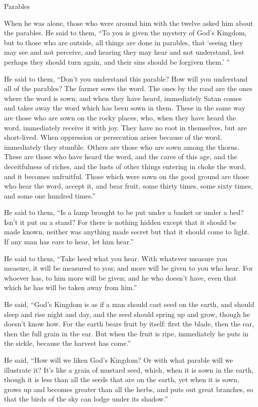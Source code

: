 \documentclass[10pt,twoside]{book}
\begin{document}
\begin{section}{Parables}
{  When he was alone, those who were around him with the twelve asked him about the parables.   He said to them, ``To you is given the mystery of God's Kingdom, but to those who are outside, all things are done in parables,    that `seeing they may see and not perceive, and hearing they may hear and not understand, lest perhaps they should turn again, and their sins should be forgiven them.' ''

  He said to them, ``Don't you understand this parable? How will you understand all of the parables?    The farmer sows the word.    The ones by the road are the ones where the word is sown; and when they have heard, immediately Satan comes and takes away the word which has been sown in them.    These in the same way are those who are sown on the rocky places, who, when they have heard the word, immediately receive it with joy.    They have no root in themselves, but are short-lived. When oppression or persecution arises because of the word, immediately they stumble.    Others are those who are sown among the thorns. These are those who have heard the word,    and the cares of this age, and the deceitfulness of riches, and the lusts of other things entering in choke the word, and it becomes unfruitful.    Those which were sown on the good ground are those who hear the word, accept it, and bear fruit, some thirty times, some sixty times, and some one hundred times.''

  He said to them, ``Is a lamp brought to be put under a basket  or under a bed? Isn't it put on a stand?    For there is nothing hidden except that it should be made known, neither was anything made secret but that it should come to light.    If any man has ears to hear, let him hear.''

  He said to them, ``Take heed what you hear. With whatever measure you measure, it will be measured to you; and more will be given to you who hear.    For whoever has, to him more will be given; and he who doesn't have, even that which he has will be taken away from him.''

  He said, ``God's Kingdom is as if a man should cast seed on the earth,    and should sleep and rise night and day, and the seed should spring up and grow, though he doesn't know how.    For the earth bears fruit by itself: first the blade, then the ear, then the full grain in the ear.    But when the fruit is ripe, immediately he puts in the sickle, because the harvest has come.''

  He said, ``How will we liken God's Kingdom? Or with what parable will we illustrate it?    It's like a grain of mustard seed, which, when it is sown in the earth, though it is less than all the seeds that are on the earth,    yet when it is sown, grows up and becomes greater than all the herbs, and puts out great branches, so that the birds of the sky can lodge under its shadow.''

}
\end{section}
\end{document}
